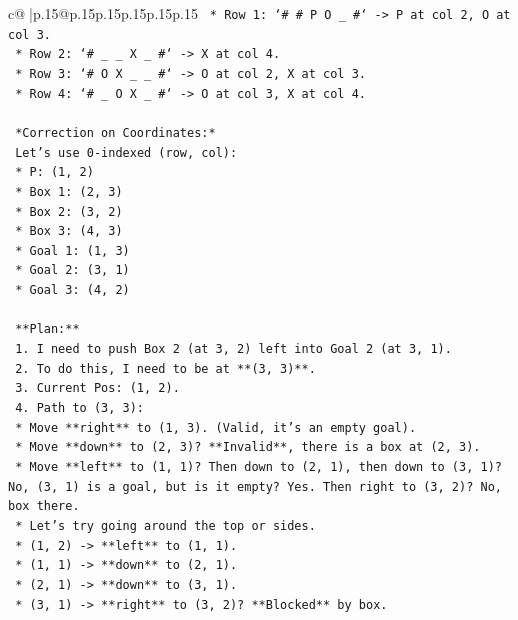 \documentclass{article}
\begin{document}
{\begin{supertabular}{c@{$\;$}|p{.15\linewidth}@{}p{.15\linewidth}p{.15\linewidth}p{.15\linewidth}p{.15\linewidth}p{.15\linewidth}}
{{{\texttt{        *   Row 1: `\# \# P O \_ \#` {-}> P at col 2, O at col 3.} \\
\texttt{        *   Row 2: `\# \_ \_ X \_ \#` {-}> X at col 4.} \\
\texttt{        *   Row 3: `\# O X \_ \_ \#` {-}> O at col 2, X at col 3.} \\
\texttt{        *   Row 4: `\# \_ O X \_ \#` {-}> O at col 3, X at col 4.} \\
\\ 
\texttt{    *Correction on Coordinates:*} \\
\texttt{    Let's use 0{-}indexed (row, col):} \\
\texttt{    *   P: (1, 2)} \\
\texttt{    *   Box 1: (2, 3)} \\
\texttt{    *   Box 2: (3, 2)} \\
\texttt{    *   Box 3: (4, 3)} \\
\texttt{    *   Goal 1: (1, 3)} \\
\texttt{    *   Goal 2: (3, 1)} \\
\texttt{    *   Goal 3: (4, 2)} \\
\\ 
\texttt{    **Plan:**} \\
\texttt{    1.  I need to push Box 2 (at 3, 2) left into Goal 2 (at 3, 1).} \\
\texttt{    2.  To do this, I need to be at **(3, 3)**.} \\
\texttt{    3.  Current Pos: (1, 2).} \\
\texttt{    4.  Path to (3, 3):} \\
\texttt{        *   Move **right** to (1, 3). (Valid, it's an empty goal).} \\
\texttt{        *   Move **down** to (2, 3)? **Invalid**, there is a box at (2, 3).} \\
\texttt{        *   Move **left** to (1, 1)? Then down to (2, 1), then down to (3, 1)? No, (3, 1) is a goal, but is it empty? Yes. Then right to (3, 2)? No, box there.} \\
\texttt{        *   Let's try going around the top or sides.} \\
\texttt{        *   (1, 2) {-}> **left** to (1, 1).} \\
\texttt{        *   (1, 1) {-}> **down** to (2, 1).} \\
\texttt{        *   (2, 1) {-}> **down** to (3, 1).} \\
\texttt{        *   (3, 1) {-}> **right** to (3, 2)? **Blocked** by box.} \\
}}}
\end{supertabular}}
\end{document}
